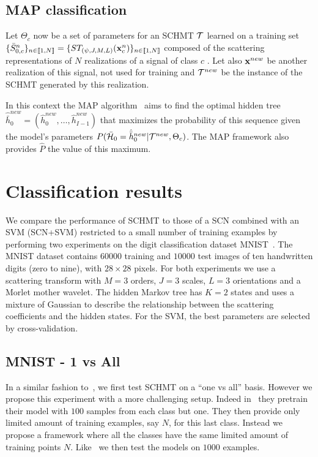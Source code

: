 \documentclass{article}
\begin{document}
  \vspace{-5pt}
	\subsection{MAP classification}
    \label{subsec:SCN/MAP}
    \vspace{-5pt}
    Let $\Theta_{c}$ now be a set of parameters for an SCHMT $\mathcal{T}$ learned on a training set $\{\bar{S}_{0,c}^n\}_{n \in \llbracket1, N \rrbracket} = \{ST_{(\psi, J, M, L)}({\bf x}_{c}^{n})\}_{n \in \llbracket1, N \rrbracket}$ composed of the scattering representations of $N$ realizations of a signal of class $c$ . Let also ${\bf x}^{new}$ be another realization of this signal, not used for training and $\mathcal{T}^{new}$ be the instance of the SCHMT generated by this realization.

    In this context the MAP algorithm~\cite{durand2001statistical} aims to find the optimal hidden tree $\hat{\bar{h}}_{0}^{new}=(\hat{h}_{0}^{new}, \ldots , \hat{h}_{I-1}^{new})$ that maximizes the probability of this sequence given the model's parameters $P(\bar{\mathcal{H}}_{0}= \hat{\bar{h}}_{0}^{new}|\mathcal{T}^{new},\Theta_{c})$. The MAP framework also provides $\hat{P}$ the value of this maximum.
    
\section{Classification results}
  \label{sec:Exps}
  \vspace{-5pt}
  We compare the performance of SCHMT to those of a SCN combined with an SVM (SCN+SVM) restricted to a small number of training examples by performing two experiments on the digit classification dataset MNIST~\cite{lecun2016web}. The MNIST dataset contains $60000$ training and $10000$ test images of ten handwritten digits (zero to nine), with $28\times28$ pixels.
  For both experiments we use a scattering transform with $M=3$ orders, $J=3$ scales, $L=3$ orientations and a Morlet mother wavelet. The hidden Markov tree has $K=2$ states and uses a mixture of Gaussian to describe the relationship between the scattering coefficients and the hidden states. For the SVM, the best parameters are selected by cross-validation.
  
  \vspace{-5pt}
  \subsection{MNIST - 1 vs All}
		\label{subsec:Exps/MNIST - 1vsAll}
		\vspace{-5pt}
		In a similar fashion to~\cite{salakhutdinov2010one}, we first test SCHMT on a ``one vs all'' basis. However we propose this experiment with a more challenging setup. Indeed in~\cite{salakhutdinov2010one} they pretrain their model with $100$ samples from each class but one. They then provide only limited amount of training examples, say $N$, for this last class. Instead we propose a framework where all the classes have the same limited amount of training points $N$. Like~\cite{salakhutdinov2010one} we then test the models on $1000$ examples.
		
\end{document}
